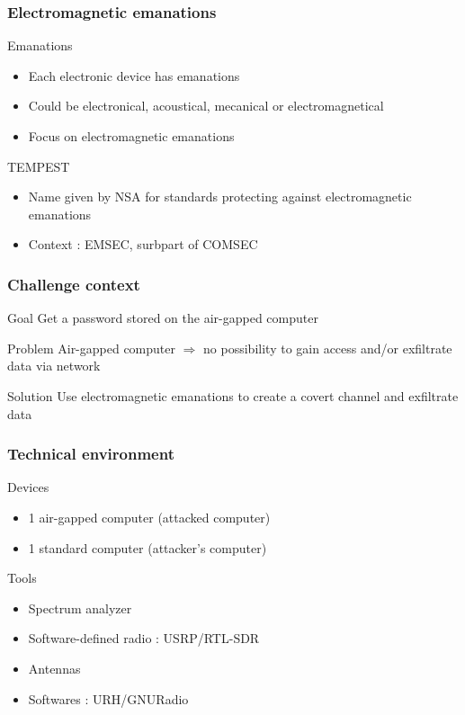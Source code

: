 \begin{frame}
\frametitle{Electromagnetic emanations}
\begin{block}{Emanations}
\begin{itemize}
\item Each electronic device has emanations
\item Could be electronical, acoustical, mecanical or electromagnetical
\item Focus on electromagnetic emanations
\end{itemize}
\end{block}

\begin{block}{TEMPEST}
\begin{itemize}
\item Name given by NSA for standards protecting against electromagnetic emanations
\item Context : EMSEC, surbpart of COMSEC
\end{itemize}
\end{block}
\end{frame}

\begin{frame}
\frametitle{Challenge context}
\begin{block}{Goal}
Get a password stored on the air-gapped computer
\end{block}

\begin{alertblock}{Problem}
Air-gapped computer $\Longrightarrow$ no possibility to gain access and/or exfiltrate data via network
\end{alertblock}

\begin{exampleblock}{Solution}
Use electromagnetic emanations to create a covert channel and exfiltrate data
\end{exampleblock}

\end{frame}


\begin{frame}
\frametitle{Technical environment}
\begin{block}{Devices}
\begin{itemize}
\item 1 air-gapped computer (attacked computer)
\item 1 standard computer (attacker's computer)
\end{itemize}
\end{block}

\begin{block}{Tools}
\begin{itemize}
\item Spectrum analyzer
\item Software-defined radio : USRP/RTL-SDR
\item Antennas
\item Softwares : URH/GNURadio
\end{itemize}
\end{block}



\end{frame}